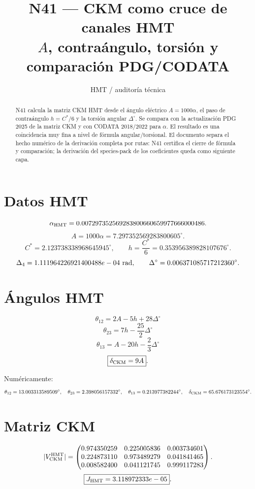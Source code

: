 \documentclass[11pt,a4paper]{article}
\title{\bfseries N41 --- CKM como cruce de canales HMT\\
\large \(A\), contraángulo, torsión y comparación PDG/CODATA}
\author{HMT / auditoría técnica}
\date{}
\begin{document}
\maketitle

\begin{abstract}
N41 calcula la matriz CKM HMT desde el ángulo eléctrico \(A=1000\alpha\), el paso de contraángulo \(h=C^\ast/6\) y la torsión angular \(\Delta^\circ\). Se compara con la actualización PDG 2025 de la matriz CKM y con CODATA 2018/2022 para \(\alpha\). El resultado es una coincidencia muy fina a nivel de fórmula angular/torsional. El documento separa el hecho numérico de la derivación completa por rutas: N41 certifica el cierre de fórmula y comparación; la derivación del species-pack de los coeficientes queda como siguiente capa.
\end{abstract}

\section{Datos HMT}

\[
\alpha_{\rm HMT}=0.007297352569283800660659977666000486.
\]
\[
A=1000\alpha=7.297352569283800605^\circ.
\]
\[
C^\ast=2.123738338968645945^\circ,\qquad h=\frac{C^\ast}{6}=0.353956389828107676^\circ.
\]
\[
\Delta_4=1.111964226921400488e-04\ {\rm rad},
\qquad
\Delta^\circ=0.006371085717212360^\circ.
\]

\section{Ángulos HMT}

\[
\boxed{\theta_{12}=2A-5h+28\Delta^\circ}
\]
\[
\boxed{\theta_{23}=7h-\frac{25}{2}\Delta^\circ}
\]
\[
\boxed{\theta_{13}=A-20h-\frac23\Delta^\circ}
\]
\[
\boxed{\delta_{\rm CKM}=9A}.
\]

Numéricamente:
\[
\theta_{12}=13.003313589509^\circ,
\quad
\theta_{23}=2.398056157332^\circ,
\quad
\theta_{13}=0.213977382244^\circ,
\quad
\delta_{\rm CKM}=65.676173123554^\circ.
\]

\section{Matriz CKM}

\[
|V_{\rm CKM}^{\rm HMT}|=
\begin{pmatrix}
0.974350259 & 0.225005836 & 0.003734601\\
0.224873110 & 0.973489279 & 0.041841465\\
0.008582400 & 0.041121745 & 0.999117283
\end{pmatrix}.
\]
\[
\boxed{J_{\rm HMT}=3.118972333e-05}.
\]
\end{document}
